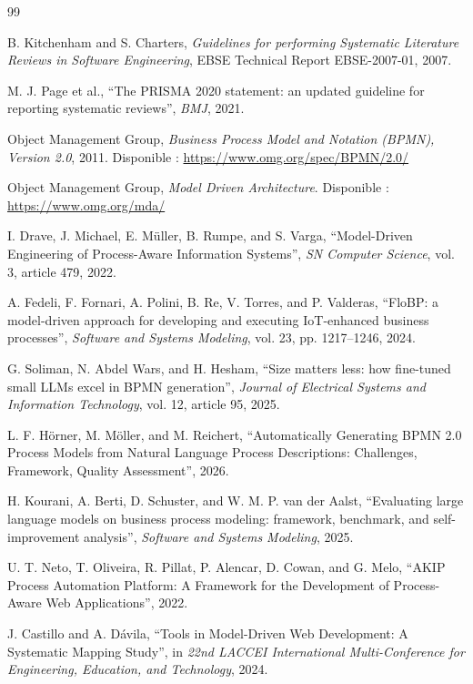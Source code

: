 \documentclass[12pt,a4paper]{article}
\begin{document}
\begin{thebibliography}{99}

B. Kitchenham and S. Charters, \textit{Guidelines for performing Systematic Literature Reviews in Software Engineering}, EBSE Technical Report EBSE-2007-01, 2007.

M. J. Page et al., ``The PRISMA 2020 statement: an updated guideline for reporting systematic reviews'', \textit{BMJ}, 2021.

Object Management Group, \textit{Business Process Model and Notation (BPMN), Version 2.0}, 2011. Disponible : \url{https://www.omg.org/spec/BPMN/2.0/}

Object Management Group, \textit{Model Driven Architecture}. Disponible : \url{https://www.omg.org/mda/}

I. Drave, J. Michael, E. Müller, B. Rumpe, and S. Varga, ``Model-Driven Engineering of Process-Aware Information Systems'', \textit{SN Computer Science}, vol. 3, article 479, 2022.

A. Fedeli, F. Fornari, A. Polini, B. Re, V. Torres, and P. Valderas, ``FloBP: a model-driven approach for developing and executing IoT-enhanced business processes'', \textit{Software and Systems Modeling}, vol. 23, pp. 1217--1246, 2024.

G. Soliman, N. Abdel Wars, and H. Hesham, ``Size matters less: how fine-tuned small LLMs excel in BPMN generation'', \textit{Journal of Electrical Systems and Information Technology}, vol. 12, article 95, 2025.

L. F. Hörner, M. Möller, and M. Reichert, ``Automatically Generating BPMN 2.0 Process Models from Natural Language Process Descriptions: Challenges, Framework, Quality Assessment'', 2026.

H. Kourani, A. Berti, D. Schuster, and W. M. P. van der Aalst, ``Evaluating large language models on business process modeling: framework, benchmark, and self-improvement analysis'', \textit{Software and Systems Modeling}, 2025.

U. T. Neto, T. Oliveira, R. Pillat, P. Alencar, D. Cowan, and G. Melo, ``AKIP Process Automation Platform: A Framework for the Development of Process-Aware Web Applications'', 2022.

J. Castillo and A. Dávila, ``Tools in Model-Driven Web Development: A Systematic Mapping Study'', in \textit{22nd LACCEI International Multi-Conference for Engineering, Education, and Technology}, 2024.


\end{thebibliography}
\end{document}
